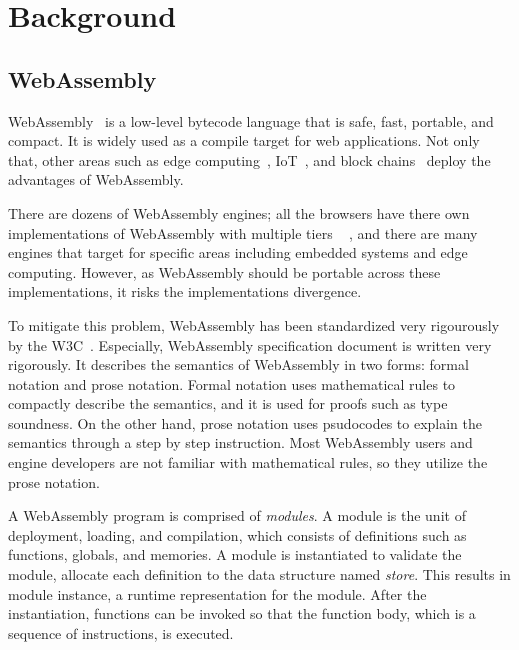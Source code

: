 
\chapter{Background}
\label{ch:background}
\noindent



\section{WebAssembly}
\label{sec:webassembly}


WebAssembly~\cite{wasm} is a low-level bytecode language that is safe, fast,
portable, and compact.
It is widely used as a compile target for web applications.
Not only that, other areas such as edge computing~\cite{wasm-edge},
IoT~\cite{wasm-iot}, and block chains~\cite{wasm-block} deploy the advantages
of WebAssembly.


There are dozens of WebAssembly engines; all the browsers have there own
implementations of WebAssembly with multiple tiers ~\cite{v8}
\cite{spidermonkey} \cite{webkit}, and there are many engines that target for
specific areas including embedded systems and edge computing.
However, as WebAssembly should be portable across these implementations, it risks
the implementations divergence.


To mitigate this problem, WebAssembly has been standardized very rigourously by
the W3C~\cite{wasm-w3c}.
Especially, WebAssembly specification document is written very rigorously.
It describes the semantics of WebAssembly in two forms: formal notation and
prose notation.
Formal notation uses mathematical rules to compactly describe the semantics,
and it is used for proofs such as type soundness.
On the other hand, prose notation uses psudocodes to explain the semantics
through a step by step instruction.
Most WebAssembly users and engine developers are not familiar with
mathematical rules, so they utilize the prose notation.


A WebAssembly program is comprised of \textit{modules}.
A module is the unit of deployment, loading, and compilation, which consists of
definitions such as functions, globals, and memories.
A module is instantiated to validate the module, allocate each definition to
the data structure named \textit{store}.
This results in module instance, a runtime representation for the module.
After the instantiation, functions can be invoked so that the function body,
which is a sequence of instructions, is executed.


